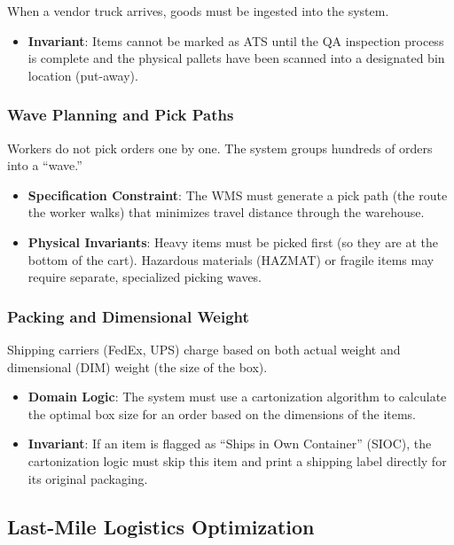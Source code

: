\documentclass[
  11pt,
  openany,
  oneside]{book}
\providecommand{\tightlist}{%
  \setlength{\itemsep}{0pt}\setlength{\parskip}{0pt}}
\begin{document}
When a vendor truck arrives, goods must be ingested into the system.

\begin{itemize}
\tightlist
\item
  \textbf{Invariant}: Items cannot be marked as ATS until the QA
  inspection process is complete and the physical pallets have been
  scanned into a designated bin location (put-away).
\end{itemize}

\subsubsection{Wave Planning and Pick
Paths}\label{wave-planning-and-pick-paths}

Workers do not pick orders one by one. The system groups hundreds of
orders into a ``wave.''

\begin{itemize}
\tightlist
\item
  \textbf{Specification Constraint}: The WMS must generate a pick path
  (the route the worker walks) that minimizes travel distance through
  the warehouse.
\item
  \textbf{Physical Invariants}: Heavy items must be picked first (so
  they are at the bottom of the cart). Hazardous materials (HAZMAT) or
  fragile items may require separate, specialized picking waves.
\end{itemize}

\subsubsection{Packing and Dimensional
Weight}\label{packing-and-dimensional-weight}

Shipping carriers (FedEx, UPS) charge based on both actual weight and
dimensional (DIM) weight (the size of the box).

\begin{itemize}
\tightlist
\item
  \textbf{Domain Logic}: The system must use a cartonization algorithm
  to calculate the optimal box size for an order based on the dimensions
  of the items.
\item
  \textbf{Invariant}: If an item is flagged as ``Ships in Own
  Container'' (SIOC), the cartonization logic must skip this item and
  print a shipping label directly for its original packaging.
\end{itemize}

\subsection{Last-Mile Logistics
Optimization}\label{last-mile-logistics-optimization}
\end{document}

